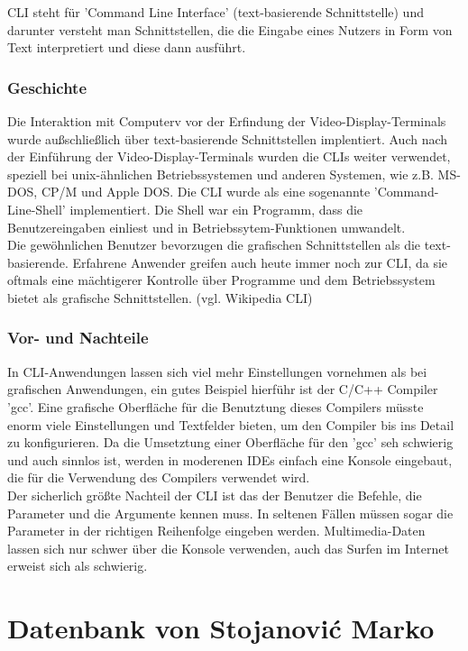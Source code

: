 \documentclass[11pt,a4paper]{report}
\begin{document}
CLI steht für 'Command Line Interface' (text-basierende Schnittstelle) und darunter versteht man Schnittstellen, die die Eingabe eines Nutzers in Form von Text interpretiert und diese dann ausführt.

\subsection{Geschichte}

Die Interaktion mit Computerv vor der Erfindung der Video-Display-Terminals wurde außschließlich über text-basierende Schnittstellen implentiert. Auch nach der Einführung der Video-Display-Terminals wurden die CLIs weiter verwendet, speziell bei unix-ähnlichen Betriebssystemen und anderen Systemen, wie z.B. MS-DOS, CP/M und Apple DOS. Die CLI wurde als eine sogenannte 'Command-Line-Shell' implementiert. Die Shell war ein Programm, dass die Benutzereingaben einliest und in Betriebssytem-Funktionen umwandelt.\\
Die gewöhnlichen Benutzer bevorzugen die grafischen Schnittstellen als die text-basierende. Erfahrene Anwender greifen auch heute immer noch zur CLI, da sie oftmals eine mächtigerer Kontrolle über Programme und dem Betriebssystem bietet als grafische Schnittstellen. (vgl. Wikipedia CLI)\\

\subsection{Vor- und Nachteile}

In CLI-Anwendungen lassen sich viel mehr Einstellungen vornehmen als bei grafischen Anwendungen, ein gutes Beispiel hierführ ist der C/C++ Compiler 'gcc'. Eine grafische Oberfläche für die Benutztung dieses Compilers müsste enorm viele Einstellungen und Textfelder bieten, um den Compiler bis ins Detail zu konfigurieren. Da die Umsetztung einer Oberfläche für den 'gcc' seh schwierig und auch sinnlos ist, werden in moderenen IDEs einfach eine Konsole eingebaut, die für die Verwendung des Compilers verwendet wird.\\

Der sicherlich größte Nachteil der CLI ist das der Benutzer die Befehle, die Parameter und die Argumente kennen muss. In seltenen Fällen müssen sogar die Parameter in der richtigen Reihenfolge eingeben werden. Multimedia-Daten lassen sich nur schwer über die Konsole verwenden, auch das Surfen im Internet erweist sich als schwierig.

\chapter{Datenbank von Stojanovi\'{c} Marko}
\end{document}
